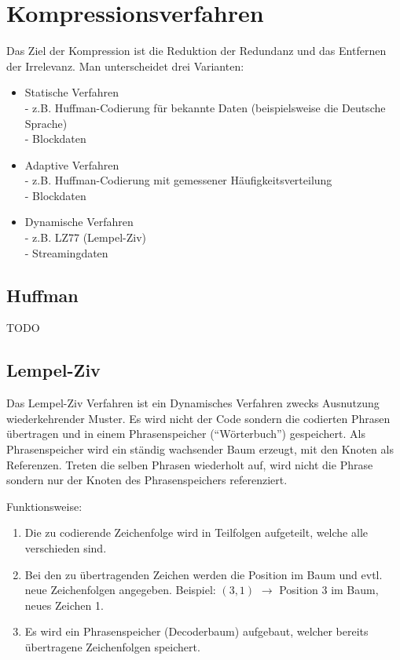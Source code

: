 \section{Kompressionsverfahren}

Das Ziel der Kompression ist die Reduktion der Redundanz und das Entfernen der
Irrelevanz. Man unterscheidet drei Varianten:

\begin{itemize}
	\item Statische Verfahren\\
		- z.B. Huffman-Codierung für bekannte Daten (beispielsweise die Deutsche
		Sprache)\\
		- Blockdaten
	\item Adaptive Verfahren\\
		- z.B. Huffman-Codierung mit gemessener Häufigkeitsverteilung\\
		- Blockdaten
	\item Dynamische Verfahren\\
		- z.B. LZ77 (Lempel-Ziv)\\
		- Streamingdaten
\end{itemize}

\subsection{Huffman}

TODO

\subsection{Lempel-Ziv}

Das Lempel-Ziv Verfahren ist ein Dynamisches Verfahren zwecks Ausnutzung
wiederkehrender Muster. Es wird nicht der Code sondern die codierten Phrasen
übertragen und in einem Phrasenspeicher (``Wörterbuch'') gespeichert. Als
Phrasenspeicher wird ein ständig wachsender Baum erzeugt, mit den Knoten als
Referenzen. Treten die selben Phrasen wiederholt auf, wird nicht die Phrase
sondern nur der Knoten des Phrasenspeichers referenziert.

Funktionsweise:

\begin{enumerate}
	\item Die zu codierende Zeichenfolge wird in Teilfolgen aufgeteilt, welche
		alle verschieden sind.
	\item Bei den zu übertragenden Zeichen werden die Position im Baum und evtl.
		neue Zeichenfolgen angegeben. Beispiel: $(3,1)$ $\rightarrow$ Position 3 im
		Baum, neues Zeichen 1.
	\item Es wird ein Phrasenspeicher (Decoderbaum) aufgebaut, welcher bereits
		übertragene Zeichenfolgen speichert.
\end{enumerate}

